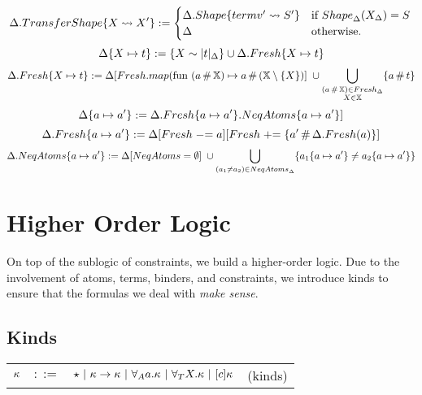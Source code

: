 \documentclass[english, mgr]{iithesis}
\renewcommand{\it}[1]{\textit{#1}}
\begin{document}
$$
\Delta.{TransferShape}\{X \leadsto X'\} :=
  \begin{cases}
    \Delta.{Shape}\{termv' \leadsto  S'\}    &\text{if } {Shape}_{\Delta}( X_{\Delta}) = S \\
    \Delta &\text{otherwise.}\\
  \end{cases} \\
$$
$$
\Delta\{X \mapsto t\} := \{X \sim  |t|_{\Delta} \} \cup \Delta.{Fresh}\{X \mapsto t\}
$$
$$
\Delta.{Fresh}\{X \mapsto t\} :=
 \Delta[{Fresh}.map(\text{fun } (a \,\#\, \mathbb{X}) \mapsto a \,\#\, (\mathbb{X} \setminus \{ X\})] \;
 \cup \bigcup_{\substack{(a \,\#\, \mathbb{X}) \in {Fresh}_{\Delta} \\ X \in \mathbb{X}}}
    \{ a \,\#\, t \}
$$
$$
\Delta\{a \mapsto a'\} := \Delta.{Fresh}\{a \mapsto a'\}.{NeqAtoms}\{a \mapsto a'\}]
$$
$$
\Delta.{Fresh}\{a \mapsto a'\} := \Delta[{Fresh} \mathrel{-}= a][{Fresh} \mathrel{+}= \{a' \,\#\, \Delta.{Fresh}(a)\}]
$$
$$
\Delta.{NeqAtoms}\{a \mapsto a'\} :=
\Delta[{NeqAtoms} = \emptyset] \;
 \cup \bigcup_{ (a_1 \neq a_2) \in {NeqAtoms}_{\Delta}  }
    \{ a_1\{a \mapsto a'\} \neq a_2\{a \mapsto a'\}\}
$$

\chapter{Higher Order Logic}

On top of the sublogic of constraints, we build a higher-order logic.
Due to the involvement of atoms, terms, binders, and constraints,
we introduce kinds to ensure that the formulas we deal with \it{make sense}.

\section{Kinds}

\begin{tabular}{rclr}
$\kappa$ & $::=$ & $\star
            \ |\  \kappa \to \kappa
            \ |\  \forall_A a . \kappa
            \ |\  \forall_T X . \kappa
            \ |\  [c] \kappa$
    & (kinds)
\end{tabular}
\end{document}
